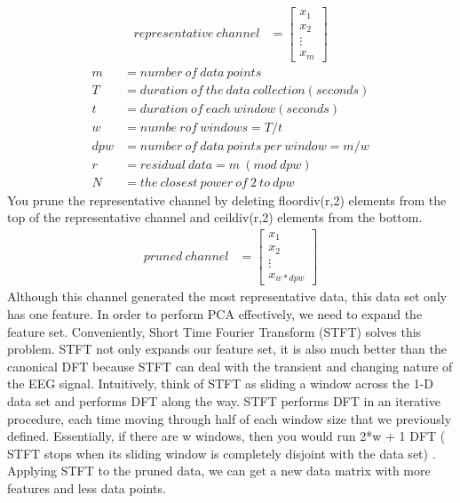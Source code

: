 \documentclass{article}
\begin{document}
   \begin{align}
   	representative\:channel &= \begin{bmatrix}
            x_{1} \\
            x_{2} \\
            \vdots \\
            x_{m}
         \end{bmatrix}
   \end{align}
   \begin{align}
   	m &= number\: of\: data\: points \\
   	T &= duration \:of \:the \:data \:collection (seconds) \\
   	t &= duration\: of \:each\: window (seconds)\\
   	w &= numbe\:r of\: windows = T/t\\
   	dpw &= number\: of\: data\: points \:per \:window = m/w\\
   	r &= residual \:data = m \:(mod \:dpw)\\
   	N &= the \:closest \:power\: of\: 2\: to\: dpw
   \end{align}
You prune the representative channel by deleting floordiv(r,2) elements from the top of the representative channel and ceildiv(r,2) elements from the bottom.
   \begin{align}
	pruned\:channel &= \begin{bmatrix}
            x_{1} \\
            x_{2} \\
            \vdots \\
            x_{w * dpw}
         \end{bmatrix}    
   \end{align}
Although this channel generated the most representative data, this data set only has one feature. In order to perform PCA effectively, we need to expand the feature set. Conveniently, Short Time Fourier Transform (STFT) solves this problem. STFT not only expands our feature set, it is also much better than the canonical DFT because STFT can deal with the transient and changing nature of the EEG signal. 
Intuitively, think of STFT as sliding a window across the 1-D data set and performs DFT along the way.
STFT performs DFT in an iterative procedure, each time moving through half of each window size that we previously defined. Essentially, if there are w windows, then you would run 2*w + 1 DFT ( STFT stops when its sliding window is completely disjoint with the data set) .
Applying STFT to the pruned data, we can get a new data matrix with more features and less data points.
\end{document}
